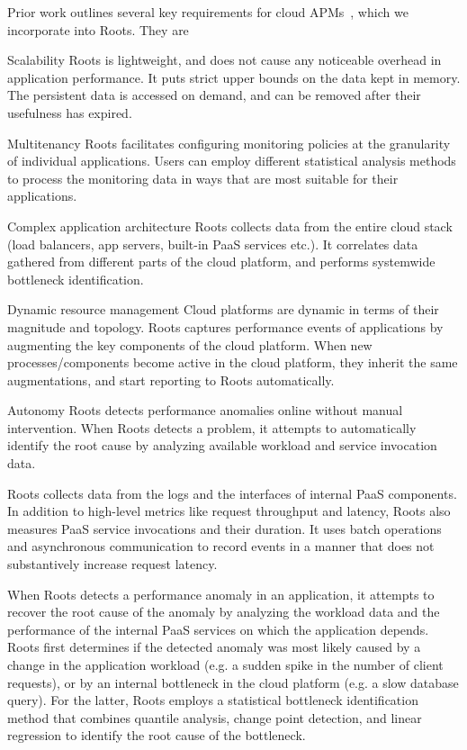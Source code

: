 Prior work outlines several key requirements for cloud APMs~\cite{DaCunhaRodrigues:2016:MCC:2851613.2851619,Ibidunmoye:2015:PAD:2808687.2791120},
which we incorporate into Roots.  They are
\begin{LaTeXdescription}
\item[Scalability] Roots is lightweight, and does not cause any noticeable overhead in 
application performance. It puts strict upper bounds on the data kept in memory. 
The persistent data is accessed on demand, and can be removed after their usefulness has expired.
\item[Multitenancy] Roots facilitates configuring monitoring policies at the granularity of individual applications.
Users can employ different statistical analysis methods to process the monitoring data in ways that are 
most suitable for their applications.
\item[Complex application architecture] Roots collects data from the entire cloud stack 
(load balancers, app servers, built-in PaaS services etc.). It correlates data gathered
from different parts of the cloud platform, and performs systemwide bottleneck identification.
\item[Dynamic resource management] Cloud platforms are dynamic in terms of their magnitude 
and topology. Roots captures performance events of applications by augmenting 
the key components of the cloud platform. When new processes/components become active
in the cloud platform, they inherit the same augmentations, and start reporting to Roots automatically.
\item[Autonomy] Roots detects performance anomalies online without manual intervention.
When Roots detects a problem, it attempts to automatically identify the root cause by analyzing
available workload and service invocation data.
\vspace{-0.05in}
\end{LaTeXdescription}

Roots collects data from the logs and the interfaces of internal PaaS components.
In addition to high-level metrics like request throughput
and latency, 
Roots also measures PaaS service invocations and their duration.
It uses batch operations and asynchronous 
communication to record events in a manner that does not substantively
increase request latency.

When Roots detects a performance anomaly in an application, it attempts to recover the
root cause of the anomaly by analyzing the workload data
and the performance of the internal PaaS services on which the 
application depends.
Roots first determines if the detected anomaly was most likely caused by a change in the
application workload (e.g. a sudden spike in the number of client requests), or by an internal
bottleneck in the cloud platform (e.g. a slow database query). 
For the latter,
Roots employs a statistical bottleneck identification method 
that  combines quantile analysis, change point detection,
and linear regression to identify the root cause of the bottleneck.

